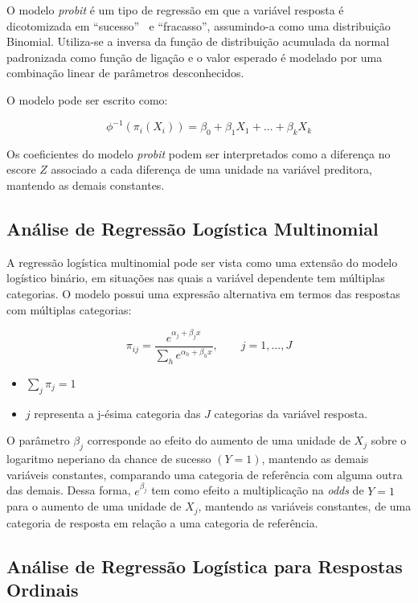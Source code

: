 \documentclass[
  portuguese,
]{estat/estat}
\providecommand{\tightlist}{%
  \setlength{\itemsep}{0pt}\setlength{\parskip}{0pt}}
\begin{document}
O modelo \emph{probit} é um tipo de regressão em que a variável resposta
é dicotomizada em ``sucesso'' \(\:\) e ``fracasso'', assumindo-a como
uma distribuição Binomial. Utiliza-se a inversa da função de
distribuição acumulada da normal padronizada como função de ligação e o
valor esperado é modelado por uma combinação linear de parâmetros
desconhecidos.

O modelo pode ser escrito como:

\[ \phi^{-1}(\pi_i(X_i))=\beta_0+\beta_1X_1+...+\beta_kX_k \]

Os coeficientes do modelo \emph{probit} podem ser interpretados como a
diferença no escore \(Z\) associado a cada diferença de uma unidade na
variável preditora, mantendo as demais constantes.

\subsection{Análise de Regressão Logística
Multinomial}\label{anuxe1lise-de-regressuxe3o-loguxedstica-multinomial}

A regressão logística multinomial pode ser vista como uma extensão do
modelo logístico binário, em situações nas quais a variável dependente
tem múltiplas categorias. O modelo possui uma expressão alternativa em
termos das respostas com múltiplas categorias:

\[
\pi_{ij}=\frac{e^{\alpha_j+\beta_jx}}{\sum_h e^{\alpha_h+\beta_hx}}, \qquad j=1, ..., J
\]

\begin{itemize}
\tightlist
\item
  \(\sum_j\pi_j=1\)
\item
  \(j\) representa a j-ésima categoria das \(J\) categorias da variável
  resposta.
\end{itemize}

O parâmetro \(\beta_{j}\) corresponde ao efeito do aumento de uma
unidade de \(X_{j}\) sobre o logaritmo neperiano da chance de sucesso
\((Y=1)\), mantendo as demais variáveis constantes, comparando uma
categoria de referência com alguma outra das demais. Dessa forma,
\(\displaystyle e^{\beta_j}\) tem como efeito a multiplicação na
\emph{odds} de \(Y=1\) para o aumento de uma unidade de \(X_{j}\),
mantendo as variáveis constantes, de uma categoria de resposta em
relação a uma categoria de referência.

\subsection{Análise de Regressão Logística para Respostas
Ordinais}\label{anuxe1lise-de-regressuxe3o-loguxedstica-para-respostas-ordinais}
\end{document}
